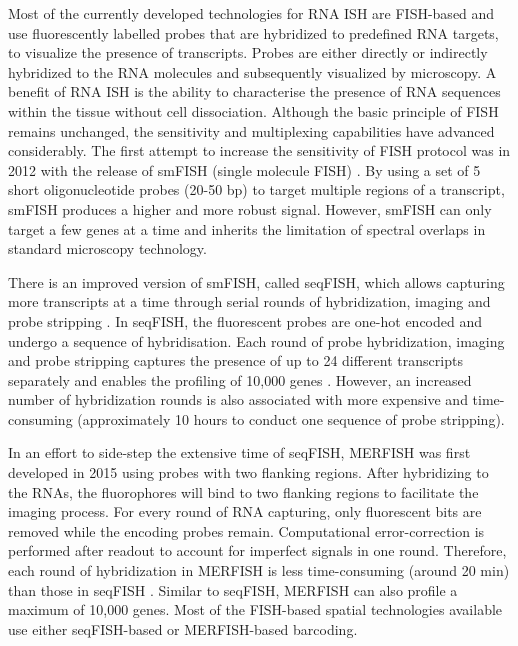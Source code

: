 Most of the currently developed technologies for RNA ISH are FISH-based and use fluorescently labelled probes that are hybridized to predefined RNA targets, to visualize the presence of transcripts. Probes are either directly or indirectly hybridized to the RNA molecules and subsequently visualized by microscopy. A benefit of RNA ISH is the ability to characterise the presence of RNA sequences within the tissue without cell dissociation. Although the basic principle of FISH remains unchanged, the sensitivity and multiplexing capabilities have advanced considerably. The first attempt to increase the sensitivity of FISH protocol was in 2012 with the release of smFISH (single molecule FISH) \cite{ji2012single}. By using a set of 5 short oligonucleotide probes (20-50 bp) to target multiple regions of a transcript, smFISH produces a higher and more robust signal. However, smFISH can only target a few genes at a time and inherits the limitation of spectral overlaps in standard microscopy technology.

There is an improved version of smFISH, called seqFISH, which allows capturing more transcripts at a time through serial rounds of hybridization, imaging and probe stripping \cite{asp2020spatially}. In seqFISH, the fluorescent probes are one-hot encoded and undergo a sequence of hybridisation. Each round of probe hybridization, imaging and probe stripping captures the presence of up to 24 different transcripts separately and enables the profiling of 10,000 genes \cite{moses2022museum,eng2019transcriptome}. However, an increased number of hybridization rounds is also associated with more expensive and time-consuming (approximately 10 hours to conduct one sequence of probe stripping). 

In an effort to side-step the extensive time of seqFISH, MERFISH was first developed in 2015 \cite{chen2015spatially} using probes with two flanking regions. After hybridizing to the RNAs, the fluorophores will bind to two flanking regions to facilitate the imaging process. For every round of RNA capturing, only fluorescent bits are removed while the encoding probes remain. Computational error-correction is performed after readout to account for imperfect signals in one round. Therefore, each round of hybridization in MERFISH is less time-consuming (around 20 min) than those in seqFISH \cite{moses2022museum}. Similar to seqFISH, MERFISH can also profile a maximum of 10,000 genes. Most of the FISH-based spatial technologies available use either seqFISH-based or MERFISH-based barcoding. 

